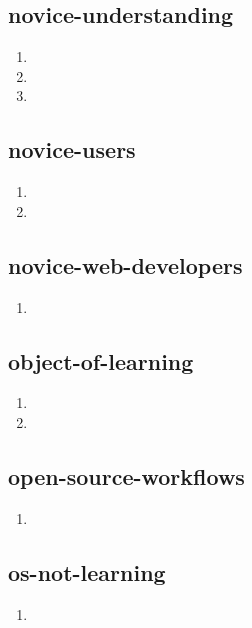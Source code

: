 \documentclass{article}
\begin{document}
\subsection{novice-understanding}
\begin{enumerate}
\item {}
\item {}
\item {}
\end{enumerate}

\subsection{novice-users}
\begin{enumerate}
\item {}
\item {}
\end{enumerate}

\subsection{novice-web-developers}
\begin{enumerate}
\item {}
\end{enumerate}

\subsection{object-of-learning}
\begin{enumerate}
\item {}
\item {}
\end{enumerate}

\subsection{open-source-workflows}
\begin{enumerate}
\item {}
\end{enumerate}

\subsection{os-not-learning}
\begin{enumerate}
\item {}
\end{enumerate}
\end{document}
